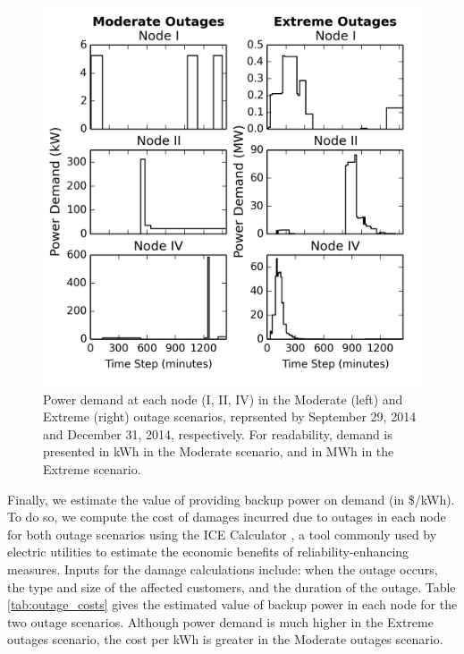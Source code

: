 \documentclass[journal]{IEEEtran}
\begin{document}
\begin{figure}[!htbp]
  \includegraphics[width=\linewidth]{plots/power_demand.png}
  \caption{Power demand at each node (I, II, IV) in the Moderate (left) and Extreme (right) outage scenarios, reprsented by September 29, 2014 and December 31, 2014, respectively. For readability, demand is presented in kWh in the Moderate scenario, and in MWh in the Extreme scenario.}
  \label{fig:power_demand}
\end{figure}

Finally, we estimate the value of providing backup power on demand (in \$/kWh). To do so, we compute the cost of damages incurred due to outages in each node for both outage scenarios using the ICE Calculator \cite{ice_calculator_2015}, a tool commonly used by electric utilities to estimate the economic benefits of reliability-enhancing measures. Inputs for the damage calculations include: when the outage occurs, the type and size of the affected customers, and the duration of the outage. Table \ref{tab:outage_costs} gives the estimated value of backup power in each node for the two outage scenarios. Although power demand is much higher in the Extreme outages scenario, the cost per kWh is greater in the Moderate outages scenario.
\end{document}
